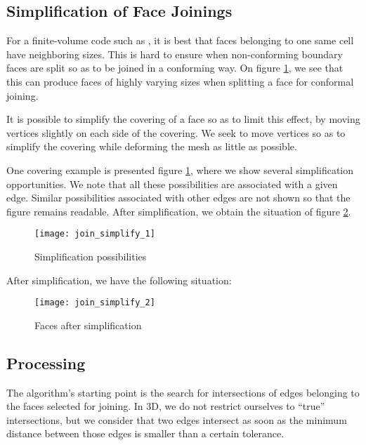 \subsection*{Simplification of Face Joinings\label{sec:join.simplif}}

For a finite-volume code such as \CS, it is best that faces belonging
to one same cell have neighboring sizes. This is hard to ensure
when non-conforming boundary faces are split so as to be joined
in a conforming way. On figure \ref{fig:algo.join.simplif},
we see that this can produce faces of highly varying sizes
when splitting a face for conformal joining.

It is possible to simplify the covering of a face so as to limit
this effect, by moving vertices slightly on each side of the covering.
We seek to move vertices so as to simplify the covering while
deforming the mesh as little as possible.

One covering example is presented figure \ref{fig:algo.join.simplif},
where we show several simplification opportunities. We note that all
these possibilities are associated with a given edge. Similar
possibilities associated with other edges are not shown so that the
figure remains readable. After simplification, we obtain the
situation of figure \ref{fig:algo.join.simpl2}.

\begin{figure}[!h]
\centerline{
\texttt{[image: join\_simplify\_1]}}
\caption{Simplification possibilities}
\label{fig:algo.join.simplif}
\end{figure}

After simplification, we have the following situation:

\begin{figure}[!h]
\centerline{
\texttt{[image: join\_simplify\_2]}}
\caption{Faces after simplification}
\label{fig:algo.join.simpl2}
\end{figure}

\subsection*{Processing\label{sec:join.process}}

The algorithm's starting point is the search for intersections
of edges belonging to the faces selected for joining. In 3D, we
do not restrict ourselves to ``true'' intersections, but
we consider that two edges intersect as soon as the minimum
distance between those edges is smaller than a certain tolerance.

